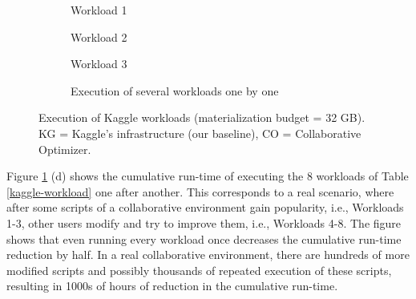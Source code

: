 \begin{figure}
\begin{subfigure}[b]{0.33\linewidth}
\centering
 \resizebox{\columnwidth}{!}{%
%
}

\caption{Workload 1}
\end{subfigure}%
\begin{subfigure}[b]{0.33\linewidth}
\centering
 \resizebox{\columnwidth}{!}{%
%
}

\caption{Workload 2}
\end{subfigure}%
\begin{subfigure}[b]{0.33\linewidth}
\centering
 \resizebox{\columnwidth}{!}{%
%
}
\caption{Workload 3}
\end{subfigure}
\begin{subfigure}[b]{\linewidth}
\centering
 \resizebox{\columnwidth}{!}{%
%
}
\caption{Execution of several workloads one by one}
\end{subfigure}
\caption{Execution of Kaggle workloads (materialization budget = 32 GB). KG = Kaggle's infrastructure (our baseline), CO = Collaborative Optimizer.}
\label{exp-reuse-kaggle-same-workload}
\end{figure}

Figure \ref{exp-reuse-kaggle-same-workload} (d) shows the cumulative run-time of executing the 8 workloads of Table \ref{kaggle-workload} one after another.
This corresponds to a real scenario, where after some scripts of a collaborative environment gain popularity, i.e., Workloads 1-3, other users modify and try to improve them, i.e., Workloads 4-8.
The figure shows that even running every workload once decreases the cumulative run-time reduction by half.
In a real collaborative environment, there are hundreds of more modified scripts and possibly thousands of repeated execution of these scripts, resulting in 1000s of hours of reduction in the cumulative run-time.

